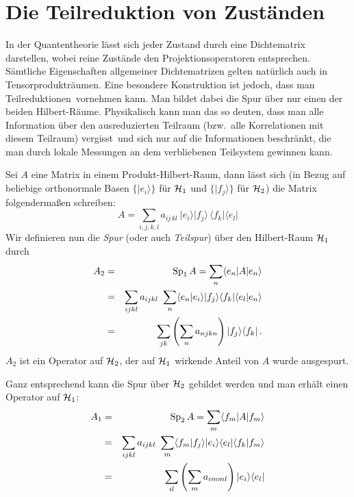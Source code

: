 \section{Die Teilreduktion von Zust\"anden}
\label{sec_Teilreduktion}

In der Quantentheorie l\"asst sich jeder
Zustand durch eine Dichtematrix darstellen, wobei reine
Zust\"ande den Projektionsoperatoren entsprechen. S\"amtliche
Eigenschaften allgemeiner Dichtematrizen gelten nat\"urlich
auch in Tensorproduktr\"aumen. Eine besondere
Konstruktion ist jedoch, 
dass man \glqq Teilreduktionen\grqq\ vornehmen
kann. Man bildet dabei die Spur \"uber nur einen
der beiden Hilbert-R\"aume. Physikalisch kann man das so
deuten, dass man alle Information \"uber den ausreduzierten Teilraum (bzw.\ alle 
Korrelationen mit diesem Teilraum) \glqq vergisst\grqq\ und sich nur auf die Informationen
beschr\"ankt, die man durch lokale Messungen an dem verbliebenen
Teilsystem gewinnen kann.

Sei $A$ eine Matrix in einem Produkt-Hilbert-Raum, dann l\"asst
sich (in Bezug auf beliebige orthonormale 
Basen $\{|e_i\rangle\}$ f\"ur ${\cal H}_1$
und $\{|f_j\rangle\}$ f\"ur ${\cal H}_2$) die Matrix folgenderma\ss en
schreiben:
\begin{equation}
     A = \sum_{i,j,k,l}  a_{ij\,kl} ~ | e_i\rangle | f_j\rangle \,
           \langle f_k|  \langle e_l|  
\end{equation} 
Wir definieren nun die 
\textit{Spur} (oder auch \textit{Teilspur}) \"uber den
Hilbert-Raum ${\cal H}_1$ durch
\begin{eqnarray}
        A_2 &=&  {\rm Sp}_1\, A = \sum_{n} \langle e_n |A | e_n \rangle \\
         &=&
          \sum_{ijkl} a_{ijkl} ~ \sum_n \langle e_n| e_i \rangle 
          |f_j\rangle \langle f_k| \langle e_l|e_n\rangle   \\
          &=& \sum_{jk} \left( \sum_n  a_{njkn} \right) |f_j\rangle \langle f_k| \, .
\end{eqnarray}
$A_2$ ist ein Operator auf ${\cal H}_2$, der auf ${\cal H}_1$ 
wirkende Anteil von $A$ wurde \glqq ausgespurt\grqq. 

Ganz entsprechend kann die Spur \"uber
${\cal H}_2$ gebildet werden und man erh\"alt einen Operator auf ${\cal H}_1$:
\begin{eqnarray}
        A_1 &=&  {\rm Sp}_2\, A = \sum_{m} \langle f_m |A | f_m \rangle \\
         &=&
          \sum_{ijkl} a_{ijkl} ~ \sum_m \langle f_m| f_j \rangle 
          |e_i\rangle \langle e_l | \langle f_k|f_m\rangle   \\
          &=& \sum_{il} \left( \sum_m  a_{imml} \right) |e_i\rangle \langle e_l| 
\end{eqnarray}

